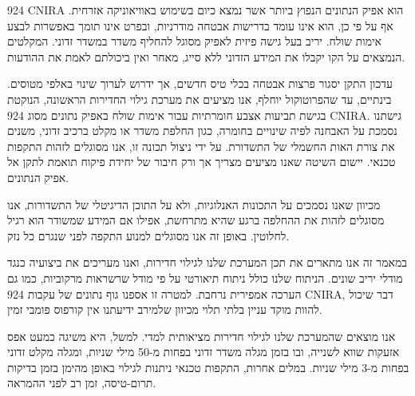 \begin{otherlanguage}{hebrew}
924 CNIRA הוא אפיק הנתונים הנפוץ ביותר אשר נמצא כיום בשימוש באוויאוניקה אזרחית. אף על פי כן, הוא אינו עומד בדרישות אבטחה מודרניות, ובפרט אינו תומך באפשרות לבצע אימות שולח. יריב בעל גישה פיזית לאפיק מסוגל להחליף משדר במשדר זדוני. המקלטים הנמצאים על הקו יקבלו את המידע הזדוני ללא סייג, מאחר ואין ביכולתם לאמת את ההודעות.

עדכון התקן יסגור פרצות אבטחה בכלי טיס חדשים, אך ידרוש לערוך שינוי באלפי מטוסים. בינתיים, עד שהפרוטוקול יוחלף, אנו מציעים את מערכת גילוי החדירות הראשונה, הנוקטת בגישת תביעות אצבע חומרתיות עבור אימות שולח באפיק נתונים מסוג 924 CNIRA. גישתנו נסמכת על האבחנה לפיה שינויים בחומרה, כגון החלפת משדר או מקלט ברכיב זדוני, משנים את צורת האות החשמלי של התשדורת. על ידי ניצול תכונה זו, אנו מסוגלים לזהות התקפות טכנאי. יישום השיטה שאנו מציעים מצריך אך ורק חיבור של יחידת פיקוח תואמת לתקן אל אפיק הנתונים.

מכיוון שאנו נסמכים על התכונות האנלוגיות, ולא על התוכן הדיגיטלי של התשדורות, אנו מסוגלים לזהות את ההחלפה ברגע שהיא מתרחשת, אפילו אם המידע שמשודר הוא רגיל לחלוטין. באופן זה אנו מסוגלים למנוע התקפה לפני שנגרם כל נזק.

במאמר זה אנו מתארים את תכן המערכת שלנו לגילוי חדירות, ואנו מעריכים את ביצועיה כנגד מודלי יריב שונים. הניתוח שלנו כולל ניתוח תיאורטי על פי מודל שרשראות מרקוביות, כמו גם הערכה אמפירית נרחבת. למטרה זו אספנו גוף נתונים של עקבות 924 CNIRA, דבר שיכול להוות מוקד עניין בלתי תלוי מכיוון שלמירב ידיעתנו אין קורפוס פומבי זמין.

אנו מוצאים שהמערכת שלנו לגילוי חדירות מציאותית למדי. למשל, היא משיגה כמעט אפס אזעקות שווא לשנייה, ובו בזמן מגלה משדר זדוני בפחות מ-50 מילי שניות, ומגלה מקלט זדוני בפחות מ-3 מילי שניות. במלים אחרות, התקפות טכנאי ניתנות לגילוי באופן מהימן בזמן בדיקות תרום-טיסה, זמן רב לפני ההמראה.
\end{otherlanguage}
